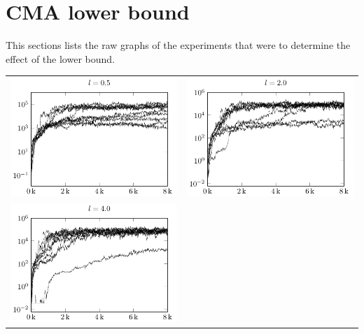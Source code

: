 \section{CMA lower bound \label{appendixCMALowerBound}}

This sections lists the raw graphs of the experiments that were
to determine the effect of the lower bound.

\begin{tabular}{@{}l@{}l@{}}
\includegraphics[scale=1]{plots/cma_lower_bound_0_5} &
\includegraphics[scale=1]{plots/cma_lower_bound_2_0}\\
\includegraphics[scale=1]{plots/cma_lower_bound_4_0} &
\end{tabular}


